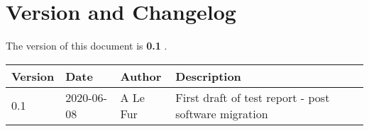 \section{Version and Changelog}

The version of this document is {\bf 0.1} .

\begin{table}[H]
    \begin{tabular}{|l|l|l|p{10cm}| }
    \hline
    {\bf Version} & {\bf Date} & {\bf Author} & {\bf Description} \\ \hline
    0.1 & 2020-06-08 & A Le Fur & First draft of test report - post software migration\\ \hline
    \end{tabular}
\end{table}
